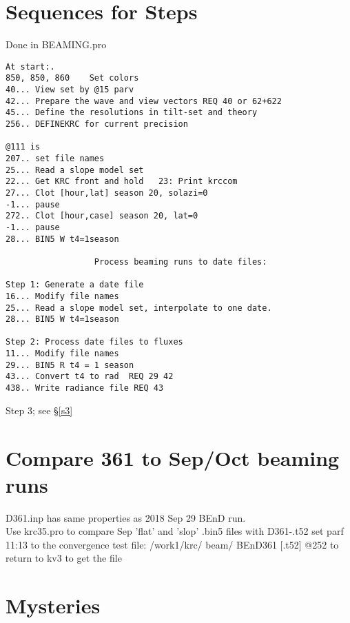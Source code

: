 \documentclass{article}
\begin{document}
\section{Sequences for Steps}
 Done in BEAMING.pro
\vspace{-3.mm} 
\begin{verbatim}
At start:.
850, 850, 860    Set colors
40... View set by @15 parv
42... Prepare the wave and view vectors REQ 40 or 62+622
45... Define the resolutions in tilt-set and theory 
256.. DEFINEKRC for current precision 

@111 is
207.. set file names
25... Read a slope model set
22... Get KRC front and hold   23: Print krccom
27... Clot [hour,lat] season 20, solazi=0
-1... pause
272.. Clot [hour,case] season 20, lat=0
-1... pause
28... BIN5 W t4=1season

                  Process beaming runs to date files:

Step 1: Generate a date file
16... Modify file names
25... Read a slope model set, interpolate to one date.
28... BIN5 W t4=1season

Step 2: Process date files to fluxes
11... Modify file names
29... BIN5 R t4 = 1 season
43... Convert t4 to rad  REQ 29 42
438.. Write radiance file REQ 43

\end{verbatim}
 Step 3; see \S \ref{s3}

\section{Compare 361 to Sep/Oct beaming runs}
D361.inp has same properties as 2018 Sep 29 BEnD run. 
\\ Use krc35.pro to compare Sep 'flat' and 'slop' .bin5 files  with D361-.t52
\qi set parf 11:13 to the convergence test file: /work1/krc/ beam/ BEnD361 [.t52]
\qi @252 to return to kv3 to get the file

\section{Mysteries}
\end{document}
